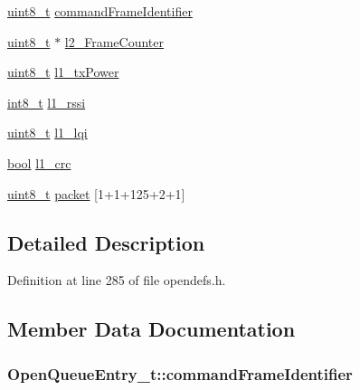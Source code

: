 \begin{DoxyCompactItemize}
\item 
\hyperlink{_p_e___types_8h_aba7bc1797add20fe3efdf37ced1182c5}{uint8\+\_\+t} \hyperlink{struct_open_queue_entry__t_a92448c46a44d49b7fc01621f4d37b2fe}{command\+Frame\+Identifier}
\item 
\hyperlink{_p_e___types_8h_aba7bc1797add20fe3efdf37ced1182c5}{uint8\+\_\+t} $\ast$ \hyperlink{struct_open_queue_entry__t_a073671f239f8af964e8cf7316f85eed7}{l2\+\_\+\+Frame\+Counter}
\item 
\hyperlink{_p_e___types_8h_aba7bc1797add20fe3efdf37ced1182c5}{uint8\+\_\+t} \hyperlink{struct_open_queue_entry__t_a553c4bfea624418821a05fe6b561e535}{l1\+\_\+tx\+Power}
\item 
\hyperlink{_p_e___types_8h_aef44329758059c91c76d334e8fc09700}{int8\+\_\+t} \hyperlink{struct_open_queue_entry__t_ae28cb0e81313085c3227cebe8ccecf33}{l1\+\_\+rssi}
\item 
\hyperlink{_p_e___types_8h_aba7bc1797add20fe3efdf37ced1182c5}{uint8\+\_\+t} \hyperlink{struct_open_queue_entry__t_a21bb7f3f54e5a10f0d649e5f7b4d98bc}{l1\+\_\+lqi}
\item 
\hyperlink{_p_e___types_8h_a97a80ca1602ebf2303258971a2c938e2}{bool} \hyperlink{struct_open_queue_entry__t_a2be96ddcea9f4bc21188863ca2392ea7}{l1\+\_\+crc}
\item 
\hyperlink{_p_e___types_8h_aba7bc1797add20fe3efdf37ced1182c5}{uint8\+\_\+t} \hyperlink{struct_open_queue_entry__t_af34b0d97e707ef9084ea7e0444c4cac6}{packet} \mbox{[}1+1+125+2+1\mbox{]}
\end{DoxyCompactItemize}


\subsection{Detailed Description}


Definition at line 285 of file opendefs.\+h.



\subsection{Member Data Documentation}
\subsubsection[{\texorpdfstring{command\+Frame\+Identifier}{commandFrameIdentifier}}]{ Open\+Queue\+Entry\+\_\+t\+::command\+Frame\+Identifier}\hypertarget{struct_open_queue_entry__t_a92448c46a44d49b7fc01621f4d37b2fe}{}\label{struct_open_queue_entry__t_a92448c46a44d49b7fc01621f4d37b2fe}


